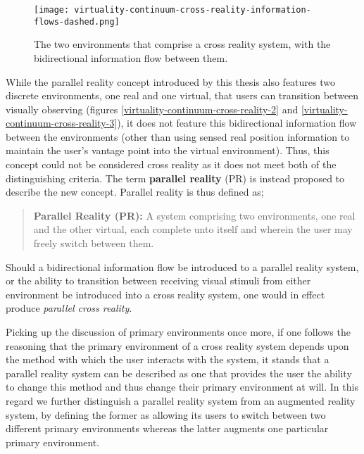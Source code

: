 \begin{figure}[h]
	\begin{center}
		\texttt{[image: virtuality-continuum-cross-reality-information-flows-dashed.png]}
		\caption{The two environments that comprise a cross reality system, with the bidirectional information flow between them.}
		\label{virtuality-continuum-cross-reality-information-flows-dashed.png}
	\end{center}
\end{figure}

While the parallel reality concept introduced by this thesis also features two discrete environments, one real and one virtual, that users can transition between visually observing (figures \ref{virtuality-continuum-cross-reality-2} and \ref{virtuality-continuum-cross-reality-3}), it does not feature this bidirectional information flow between the environments (other than using sensed real position information to maintain the user's vantage point into the virtual environment). Thus, this concept could not be considered cross reality as it does not meet both of the distinguishing criteria. The term \textbf{parallel reality} (PR) is instead proposed to describe the new concept. Parallel reality is thus defined as;

\begin{quote}
	\textbf{Parallel Reality (PR):} A system comprising two environments, one real and the other virtual, each complete unto itself and wherein the user may freely switch between them.
\end{quote}

Should a bidirectional information flow be introduced to a parallel reality system, or the ability to transition between receiving visual stimuli from either environment be introduced into a cross reality system, one would in effect produce \textit{parallel cross reality}.

Picking up the discussion of primary environments once more, if one follows the reasoning that the primary environment of a cross reality system depends upon the method with which the user interacts with the system, it stands that a parallel reality system can be described as one that provides the user the ability to change this method and thus change their primary environment at will. In this regard we further distinguish a parallel reality system from an augmented reality system, by defining the former as allowing its users to switch between two different primary environments whereas the latter augments one particular primary environment.


